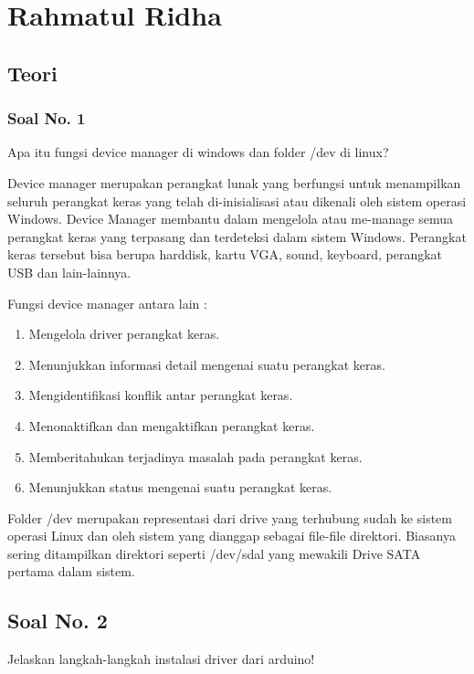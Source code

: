 \section{Rahmatul Ridha}
\subsection{Teori}
\subsubsection{Soal No. 1}
Apa itu fungsi device manager di windows dan folder /dev di linux?

Device manager merupakan perangkat lunak yang berfungsi untuk menampilkan seluruh perangkat keras yang telah di-inisialisasi atau dikenali oleh sistem operasi Windows. Device Manager membantu dalam mengelola atau me-manage semua perangkat keras yang terpasang dan terdeteksi dalam sistem Windows. Perangkat keras tersebut bisa berupa harddisk, kartu VGA, sound, keyboard, perangkat USB dan lain-lainnya.

Fungsi device manager antara lain :
\begin{enumerate}
    \item Mengelola driver perangkat keras.
	\item Menunjukkan informasi detail mengenai suatu perangkat keras.
    \item Mengidentifikasi konflik antar perangkat keras.
	\item Menonaktifkan dan mengaktifkan perangkat keras.
	\item Memberitahukan terjadinya masalah pada perangkat keras.
    \item Menunjukkan status mengenai suatu perangkat keras.
\end{enumerate}

Folder /dev merupakan representasi dari drive yang terhubung sudah ke sistem operasi Linux dan oleh sistem yang dianggap sebagai file-file direktori. Biasanya sering ditampilkan direktori seperti /dev/sdal yang mewakili Drive SATA pertama dalam sistem.

\subsection{Soal No. 2}
Jelaskan langkah-langkah instalasi driver dari arduino!

